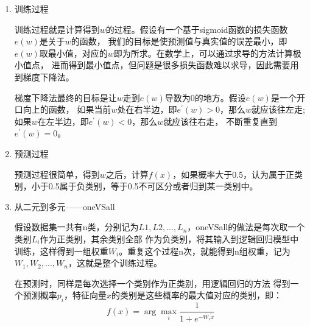 \documentclass[UTF8,a4paper,12pt]{article}
\begin{document}
\begin{enumerate}[itemindent=0.5em,label=\arabic*、]
  \item 训练过程
  \par \qquad 训练过程就是计算得到$w$的过程。假设有一个基于sigmoid函数的损失函数$e(w)$是关于$w$的函数，
  我们的目标是使预测值与真实值的误差最小，即$e(w)$取最小值，对应的$w$即为所求。在数学上，可以通过求导的方法计算极小值点，
  进而得到最小值点，但问题是很多损失函数难以求导，因此需要用到梯度下降法。
  \par \qquad 梯度下降法最终的目标是让$w$走到$e(w)$导数为0的地方。假设$e(w)$是一个开口向上的函数，
  如果当前$w$处在右半边，即$e^{'}(w)>0$，那么$w$就应该往左走;如果$w$在左半边，即$e^{'}(w)<0$，那么$w$就应该往右走，
  不断重复直到$e^{'}(w)=0$。
  \item 预测过程
  \par \qquad 预测过程很简单，得到$w$之后，计算$f(x)$，如果概率大于0.5，认为属于正类别，小于0.5属于负类别，等于0.5不可区分或者归到某一类别中。
  \item 从二元到多元——oneVSall
  \par \qquad 假设数据集一共有n类，分别记为$L1, L2, ..., L_n$，oneVSall的做法是每次取一个类别$L_i$作为正类别，其余类别全部
  作为负类别，将其输入到逻辑回归模型中训练，这样得到一组权重$W_i$。重复这个过程n次，就能得到n组权重，记为
  $W_1, W_2, ..., W_n$，这就是整个训练过程。
  \par \qquad 在预测时，同样是每次选择一个类别作为正类别，用逻辑回归的方法
  得到一个预测概率$p_i$，特征向量$x$的类别是这些概率的最大值对应的类别，即：
  \begin{equation}
    f(x) = \arg\max_{i}\frac{1}{1+e^{-W_i\widetilde{x}}}
  \end{equation}
\end{enumerate}
\end{document}
